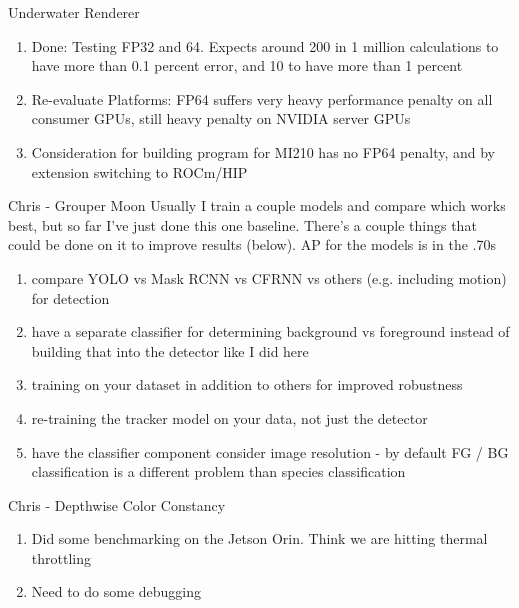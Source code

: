 \begin{frame}{Underwater Renderer}
    \begin{enumerate}
	    \item Done: Testing FP32 and 64. Expects around 200 in 1 million calculations to have more than 0.1 percent error, and 10 to have more than 1 percent
			\item Re-evaluate Platforms: FP64 suffers very heavy performance penalty on all consumer GPUs, still heavy penalty on NVIDIA server GPUs
			\item Consideration for building program for MI210 has no FP64 penalty, and by extension switching to ROCm/HIP
    \end{enumerate}
\end{frame}


\begin{frame}{Chris - Grouper Moon}
Usually I train a couple models and compare which works best, but so far I've just done this one baseline. There's a couple things that could be done on it to improve results (below). AP for the models is in the .70s

\begin{enumerate}
\item compare YOLO vs Mask RCNN vs CFRNN vs others (e.g. including motion) for detection
\item have a separate classifier for determining background vs foreground instead of building that into the detector like I did here
\item training on your dataset in addition to others for improved robustness
\item re-training the tracker model on your data, not just the detector
\item have the classifier component consider image resolution - by default FG / BG classification is a different problem than species classification
\end{enumerate}
\end{frame}


\begin{frame}{Chris - Depthwise Color Constancy}
\begin{enumerate}
\item Did some benchmarking on the Jetson Orin.  Think we are hitting thermal throttling
\item Need to do some debugging
\end{enumerate}
\end{frame}
